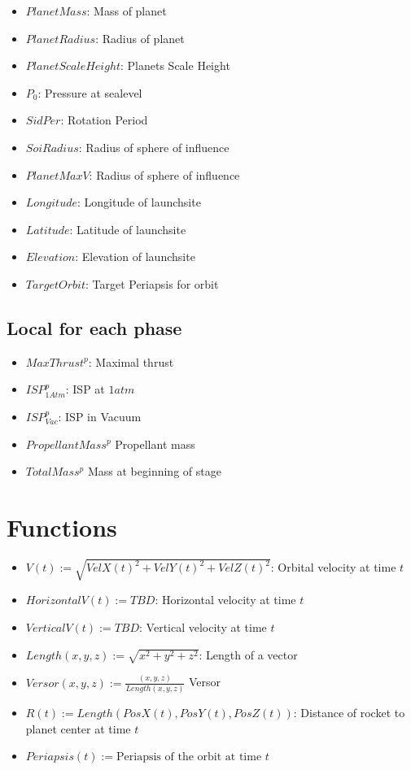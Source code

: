 \documentclass[11pt]{report}
\begin{document}
\begin{itemize}
\item $PlanetMass$: Mass of planet
\item $PlanetRadius$: Radius of planet
\item $PlanetScaleHeight$: Planets Scale Height
\item $P_0$: Pressure at sealevel
\item $SidPer$: Rotation Period
\item $SoiRadius$: Radius of sphere of influence
\item $PlanetMaxV$: Radius of sphere of influence
\item $Longitude$: Longitude of launchsite
\item $Latitude$: Latitude of launchsite
\item $Elevation$: Elevation of launchsite
\item $TargetOrbit$: Target Periapsis for orbit
\end{itemize}

\subsection{Local for each phase}

\begin{itemize}
\item $MaxThrust^p$: Maximal thrust
\item $ISP_{1Atm}^p$: ISP at $1 atm$
\item $ISP_{Vac}^p$: ISP in Vacuum
\item $PropellantMass^p$ Propellant mass
\item $TotalMass^p$ Mass at beginning of stage
\end{itemize}

\section{Functions}

\begin{itemize}
\item $V(t) := \sqrt{VelX(t)^2 + VelY(t)^2+ VelZ(t)^2}$: Orbital velocity at time $t$
\item $HorizontalV(t) := TBD$: Horizontal velocity at time $t$
\item $VerticalV(t) := TBD$: Vertical velocity at time $t$
\item $Length(x, y, z) := \sqrt{x^2 + y^2 + z^2}$: Length of a vector
\item $Versor(x, y, z) := \frac{(x, y, z)}{Length(x, y, z)}$ Versor
\item $R(t) := Length(PosX(t), PosY(t), PosZ(t))$: Distance of rocket to planet center at time $t$
\item $Periapsis(t) := \textrm{Periapsis of the orbit at time } t$
\end{itemize}
\end{document}
